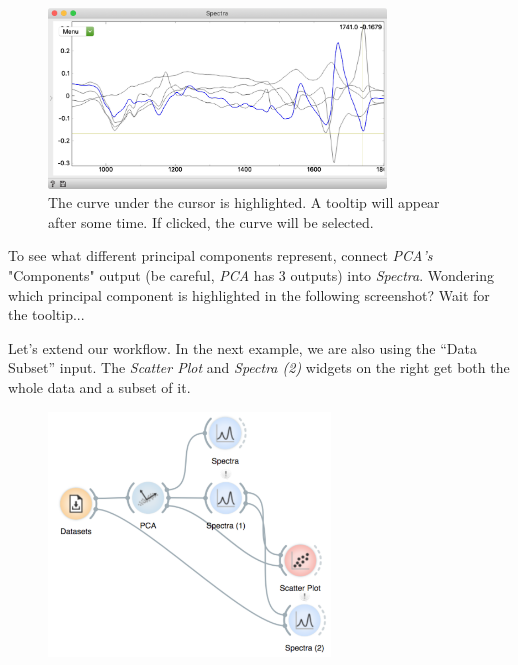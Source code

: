 \begin{figure}
  \centering
  \vspace{-0.5cm}
  \includegraphics[width=0.8\textwidth]{graphics/ch-spectral_PCA/spectral_PCA-fig3.png}%
  \caption{The curve under the cursor is highlighted. A tooltip will appear after some time. If clicked, the curve will be selected.}
  \label{fig:spectral-PCA-fig3}
\end{figure}

To see what different principal components represent, connect \textit{PCA’s} "Components" output (be careful, \textit{PCA} has 3 outputs) into \textit{Spectra}. Wondering which principal component is highlighted in the following screenshot? Wait for the tooltip...

Let's extend our workflow. In the next example, we are also using the “Data Subset” input. The \textit{Scatter Plot} and \textit{Spectra (2)} widgets on the right get both the whole data and a subset of it.

\begin{figure}
  \centering
  \includegraphics[width=75mm]{graphics/ch-spectral_PCA/spectral_PCA-fig4.png}%
  \label{fig:spectral-PCA-fig4}
\end{figure}

